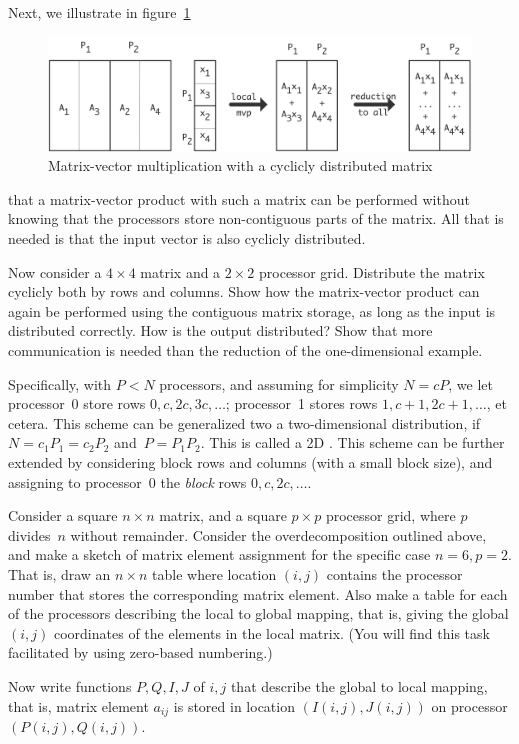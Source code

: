 Next, we illustrate in figure~\ref{fig:cyclic-1-mvp}
\begin{figure}[ht]
  \includegraphics[scale=.11]{graphics/cyclic-1-mvp}
  \caption{Matrix-vector multiplication with a cyclicly distributed matrix}
  \label{fig:cyclic-1-mvp}
\end{figure}
that a matrix-vector product with such a matrix can be performed
without knowing that the processors store non-contiguous parts of the
matrix. All that is needed is that the input vector is also cyclicly
distributed.

\begin{exercise}
  Now consider a $4\times4$ matrix and a $2\times2$ processor
  grid. Distribute the matrix cyclicly both by rows and columns. Show
  how the matrix-vector product can again be performed using the
  contiguous matrix storage, as long as the input is distributed
  correctly. How is the output distributed? Show that more
  communication is needed than the reduction of the one-dimensional
  example.
\end{exercise}

Specifically,
with $P<N$ processors, and assuming for simplicity $N=cP$, we let
processor~0 store rows $0,c,2c,3c,\ldots$; processor~1 stores rows
$1,c+1,2c+1,\ldots$, et cetera. This scheme can be generalized two a
two-dimensional distribution, if $N=c_1P_1=c_2P_2$
and~$P=P_1P_2$. This is called a 2D . This scheme can be further extended by considering
block rows and columns (with a small block size), and assigning to
processor~0 the \emph{block} rows $0,c,2c,\ldots$.

\begin{exercise}
  Consider a square $n\times n$ matrix, and a square $p\times p$
  processor grid, where $p$ divides~$n$ without remainder. Consider
  the overdecomposition outlined above, and make a sketch of matrix
  element assignment for the specific case $n=6,p=2$. That is, draw an
  $n\times n$ table where location $(i,j)$ contains the processor
  number that stores the corresponding matrix element. Also make a
  table for each of the processors describing the local to global mapping,
  that is, giving the global $(i,j)$ coordinates of the elements in
  the local matrix. (You will find this task facilitated by using
  zero-based numbering.)

  Now write functions $P,Q,I,J$ of $i,j$ that describe the global to
  local mapping, that is, matrix element $a_{ij}$ is stored in
  location $(I(i,j),J(i,j))$ on processor $(P(i,j),Q(i,j))$.
\end{exercise}

